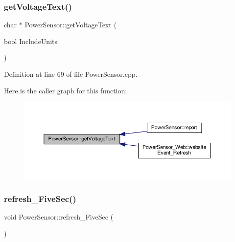 \mbox{\label{class_power_sensor_a168a4f9e8ea56397b1d67889ce3575b6}} 
\subsubsection{\texorpdfstring{get\+Voltage\+Text()}{getVoltageText()}\hspace{0.1cm}{\footnotesize\ttfamily [2/2]}}
{\footnotesize\ttfamily char $\ast$ Power\+Sensor\+::get\+Voltage\+Text (\begin{DoxyParamCaption}\item[{bool}]{Include\+Units }\end{DoxyParamCaption})}



Definition at line 69 of file Power\+Sensor.\+cpp.

Here is the caller graph for this function\+:
\nopagebreak
\begin{figure}[H]
\begin{center}
\leavevmode
\includegraphics[width=350pt]{class_power_sensor_a168a4f9e8ea56397b1d67889ce3575b6_icgraph}
\end{center}
\end{figure}
\mbox{\label{class_power_sensor_a429859d5aa4b72bac2002cda95ac5b21}} 
\subsubsection{\texorpdfstring{refresh\+\_\+\+Five\+Sec()}{refresh\_FiveSec()}\hspace{0.1cm}{\footnotesize\ttfamily [1/2]}}
{\footnotesize\ttfamily void Power\+Sensor\+::refresh\+\_\+\+Five\+Sec (\begin{DoxyParamCaption}{ }\end{DoxyParamCaption})\hspace{0.3cm}{\ttfamily [virtual]}}



